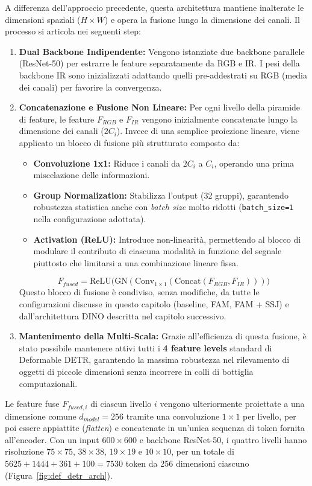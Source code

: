 \documentclass[a4paper,11pt]{article}
\begin{document}
A differenza dell'approccio precedente, questa architettura mantiene inalterate le dimensioni spaziali ($H \times W$) e opera la fusione lungo la dimensione dei canali. Il processo si articola nei seguenti step:

\begin{enumerate}
    \item \textbf{Dual Backbone Indipendente:} Vengono istanziate due backbone parallele (ResNet-50) per estrarre le feature separatamente da RGB e IR. I pesi della backbone IR sono inizializzati adattando quelli pre-addestrati su RGB (media dei canali) per favorire la convergenza.
    \item \textbf{Concatenazione e Fusione Non Lineare:} Per ogni livello della piramide di feature, le feature $F_{RGB}$ e $F_{IR}$ vengono inizialmente concatenate lungo la dimensione dei canali ($2C_i$). Invece di una semplice proiezione lineare, viene applicato un blocco di fusione più strutturato composto da:
    \begin{itemize}
        \item \textbf{Convoluzione 1x1:} Riduce i canali da $2C_i$ a $C_i$, operando una prima miscelazione delle informazioni.
        \item \textbf{Group Normalization:} Stabilizza l'output (32 gruppi), garantendo robustezza statistica anche con \textit{batch size} molto ridotti (\texttt{batch\_size=1} nella configurazione adottata).
        \item \textbf{Activation (ReLU):} Introduce non-linearità, permettendo al blocco di modulare il contributo di ciascuna modalità in funzione del segnale piuttosto che limitarsi a una combinazione lineare fissa.
    \end{itemize}
    $$ F_{fused} = \text{ReLU}\big(\text{GN}(\text{Conv}_{1\times1}(\text{Concat}(F_{RGB}, F_{IR})))\big) $$
    Questo blocco di fusione è condiviso, senza modifiche, da tutte le configurazioni discusse in questo capitolo (baseline, FAM, FAM + SSJ) e dall'architettura DINO descritta nel capitolo successivo.
    \item \textbf{Mantenimento della Multi-Scala:} Grazie all'efficienza di questa fusione, è stato possibile mantenere attivi tutti i \textbf{4 feature levels} standard di Deformable DETR, garantendo la massima robustezza nel rilevamento di oggetti di piccole dimensioni senza incorrere in colli di bottiglia computazionali.
\end{enumerate}

Le feature fuse $F_{fused,i}$ di ciascun livello $i$ vengono ulteriormente proiettate a una dimensione comune $d_{model}=256$ tramite una convoluzione $1\times1$ per livello, per poi essere appiattite (\textit{flatten}) e concatenate in un'unica sequenza di token fornita all'encoder. Con un input $600\times600$ e backbone ResNet-50, i quattro livelli hanno risoluzione $75\times75$, $38\times38$, $19\times19$ e $10\times10$, per un totale di $5625+1444+361+100=7530$ token da 256 dimensioni ciascuno (Figura~\ref{fig:def_detr_arch}).
\end{document}
